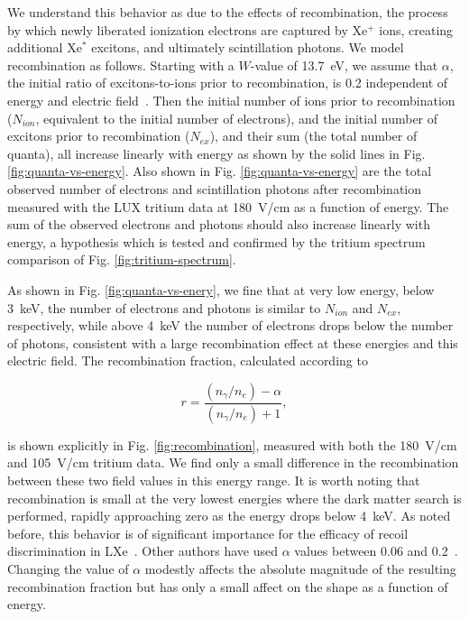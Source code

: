 We understand this behavior as due to the effects of recombination, the process by which newly liberated ionization electrons are captured by Xe$^+$ ions, creating additional Xe$^*$ excitons, and ultimately scintillation photons. We model recombination as follows. Starting with a $W$-value of 13.7~eV, we assume that $\alpha$, the initial ratio of excitons-to-ions prior to recombination, is 0.2 independent of energy and electric field~\cite{Doke_alpha}. Then the initial number of ions prior to recombination ($N_{ion}$, equivalent to the initial number of electrons), and the initial number of excitons prior to recombination ($N_{ex}$), and their sum (the total number of quanta), all increase linearly with energy as shown by the solid lines in Fig. \ref{fig:quanta-vs-energy}. Also shown in Fig. \ref{fig:quanta-vs-energy} are the total observed number of electrons and scintillation photons after recombination measured with the LUX tritium data at 180~V/cm as a function of energy. The sum of the observed electrons and photons should also increase linearly with energy, a hypothesis which is tested and confirmed by the tritium spectrum comparison of Fig. \ref{fig:tritium-spectrum}.

As shown in Fig. \ref{fig:quanta-vs-enery}, we fine that at very low energy, below 3~keV, the number of electrons and photons is similar to $N_{ion}$ and $N_{ex}$, respectively, while above 4~keV the number of electrons drops below the number of photons, consistent with a large recombination effect at these energies and this electric field. The recombination fraction, calculated according to

\begin{equation}
r = \frac{(n_{\gamma}/n_e) - \alpha}{(n_{\gamma}/n_e) + 1},
\end{equation}

\noindent
is shown explicitly in Fig. \ref{fig:recombination}, measured with both the 180~V/cm and 105~V/cm tritium data. We find only a small difference in the recombination between these two field values in this energy range. It is worth noting that recombination is small at the very lowest energies where the dark matter search is performed, rapidly approaching zero as the energy drops below 4~keV. As noted before, this behavior is of significant importance for the efficacy of recoil discrimination in LXe~\cite{xed-discrimination}. Other authors have used $\alpha$ values between 0.06 and 0.2~\cite{kaixuan}. Changing the value of $\alpha$ modestly affects the absolute magnitude of the resulting recombination fraction but has only a small affect on the shape as a function of energy. 

